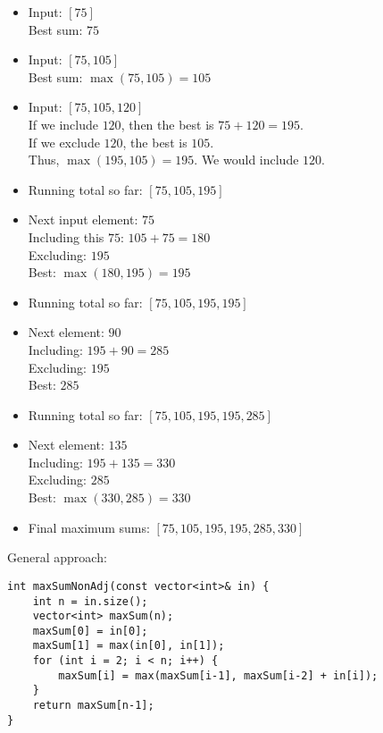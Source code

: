 \documentclass{article}
\begin{document}
\begin{itemize}
    \item Input: $[75]$ \\
    Best sum: $75$
    
    \item Input: $[75, 105]$ \\
    Best sum: $\max(75, 105) = 105$
    
    \item Input: $[75, 105, 120]$ \\
    If we include $120$, then the best is $75 + 120 = 195$. \\
    If we exclude $120$, the best is $105$. \\
    Thus, $\max(195, 105) = 195$. We would include $120$.
    
    \item Running total so far: $[75, 105, 195]$
    
    \item Next input element: $75$ \\
    Including this $75$: $105 + 75 = 180$ \\
    Excluding: $195$ \\
    Best: $\max(180, 195) = 195$
    
    \item Running total so far: $[75, 105, 195, 195]$
    
    \item Next element: $90$ \\
    Including: $195 + 90 = 285$ \\
    Excluding: $195$ \\
    Best: $285$
    
    \item Running total so far: $[75, 105, 195, 195, 285]$
    
    \item Next element: $135$ \\
    Including: $195 + 135 = 330$ \\
    Excluding: $285$ \\
    Best: $\max(330, 285) = 330$
    
    \item Final maximum sums: $[75, 105, 195, 195, 285, 330]$
\end{itemize}

General approach:

\begin{lstlisting}[style=cppstyle]
int maxSumNonAdj(const vector<int>& in) {
    int n = in.size();
    vector<int> maxSum(n);
    maxSum[0] = in[0];
    maxSum[1] = max(in[0], in[1]);
    for (int i = 2; i < n; i++) {
        maxSum[i] = max(maxSum[i-1], maxSum[i-2] + in[i]);
    }
    return maxSum[n-1];
}
\end{lstlisting}
\end{document}
